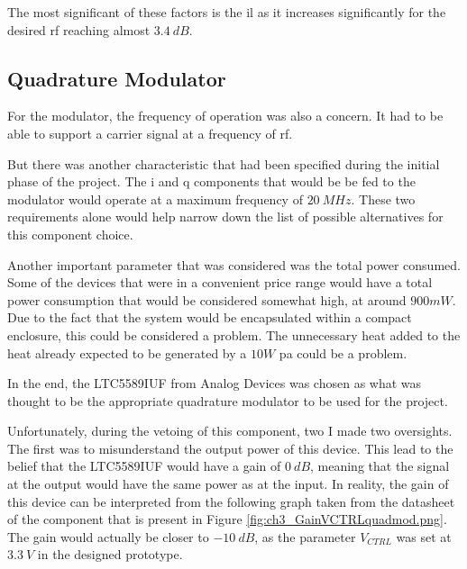 \par The most significant of these factors is the \ac{il} as it increases significantly for the desired \ac{rf} reaching almost $3.4 \:\si{dB}$.

\subsection{Quadrature Modulator}
\par For the modulator, the frequency of operation was also a concern. It had to be able to support a carrier signal at a frequency of \ac{rf}.

\par But there was another characteristic that had been specified during the initial phase of the project. The \ac{i} and \ac{q} components that would be be fed to the modulator would operate at a maximum frequency of $20 \:\si{MHz}$. These two requirements alone would help narrow down the list of possible alternatives for this component choice.

\par Another important parameter that was considered was the total power consumed. Some of the devices that were in a convenient price range would have a total power consumption that would be considered somewhat high, at around $900 mW$. Due to the fact that the system would be encapsulated within a compact enclosure, this could be considered a problem. The unnecessary heat added to the heat already expected to be generated by a $10 W$ \ac{pa} could be a problem.

\par In the end, the LTC5589IUF from Analog Devices was chosen as what was thought to be the appropriate quadrature modulator to be used for the project.

\par Unfortunately, during the vetoing of this component, two I made two oversights. The first was to misunderstand the output power of this device. This lead to the belief that the LTC5589IUF would have a gain of $0 \:\si{dB}$, meaning that the signal at the output would have the same power as at the input. In reality, the gain of this device can be interpreted from the following graph taken from the datasheet of the component that is present in Figure \ref{fig:ch3_GainVCTRLquadmod.png}. The gain would actually be closer to $-10 \:\si{dB}$, as the parameter $V_{CTRL}$ was set at $3.3 \:\si{V}$ in the designed prototype.

